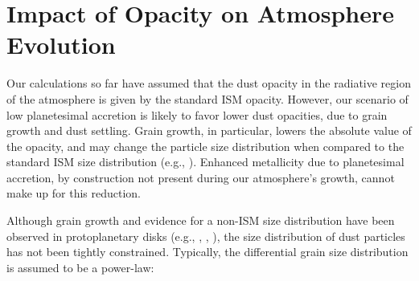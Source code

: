 %
%




\section{Impact of Opacity on Atmosphere Evolution}
\label{sec:opacity}


Our calculations so far have assumed that the dust opacity in the radiative region of the atmosphere is given by the standard ISM opacity. However, our scenario of low planetesimal accretion is likely to favor lower dust opacities, due to grain growth and dust settling. Grain growth, in particular, lowers the absolute value of the opacity, and may change the particle size distribution when compared to the standard ISM size distribution (e.g., \citealt{pollack85}). Enhanced metallicity due to planetesimal accretion, by construction not present during our atmosphere's growth, cannot make up for this reduction.


Although grain growth and evidence for a non-ISM size distribution have been observed in protoplanetary disks (e.g., \citealt{beckwith90}, \citealt{beckwith91}, \citealt{perez12}), the size distribution of dust particles has not been tightly constrained. Typically, the differential grain size distribution is assumed to be a power-law: 

